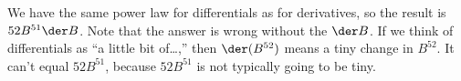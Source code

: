 We have the same power law for differentials as for derivatives, so the result is $52 B^{51}\der B$. Note that
the answer is wrong without the $\der B$. If we think of differentials as ``a little bit of\ldots,''
then $\der(B^{52})$ means a tiny change in $B^{52}$. It can't equal $52 B^{51}$, because $52 B^{51}$ is not typically
going to be tiny.
